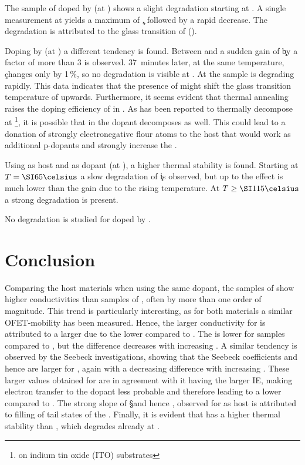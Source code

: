 The sample of \meo doped by \FS (at \C[0.040]) shows a slight degradation starting at \T[65]. A single measurement at \T[80] yields a maximum of \c, followed by a rapid decrease. The degradation is attributed to the glass transition of \meo (\Tg[67]\cite{Thelakkat1998}).

Doping \meo by \CSF (at \C[0.023]) a different tendency is found.
Between \T[70] and  a sudden gain of \c by a factor of more than 3 is observed. 37~minutes later, at the same temperature, \c changes only by 1\,\%, so no degradation is visible at \T[80]. At \T[90] the sample is degrading rapidly. 
This data indicates that the presence of \CSF might shift the glass transition temperature of \meo upwards. Furthermore, it seems evident that thermal annealing raises the doping efficiency of \CSF in \meo.
As \CSF has been reported\cite{Mao2013} to thermally decompose at \T[120]\footnote{on indium tin oxide (ITO) substrates}, it is possible that in \meo the dopant decomposes as well. This could lead to a donation of strongly electronegative flour atoms to the host that would work as additional p-dopants and strongly increase the \nhLong.

Using \lili as host and \FS as dopant (at \C[0.100]), a higher thermal stability is found. Starting at $\T[65]$ a slow degradation of \c is observed, but up to \T[100] the effect is much lower than the gain due to the rising temperature. At $\T{}\geq\grad{115}$ a strong degradation is present.

No degradation is studied for \lili doped by \CSF.

\pagebreak
\section{Conclusion} \label{sec:ResP-Conclusion}
Comparing the host materials when using the same dopant, the samples of \meo show higher conductivities than samples of \lili, often by more than one order of magnitude. This trend is particularly interesting, as for both materials a similar OFET-mobility has been measured. Hence, the larger conductivity for \meo is attributed to a larger \nhLong due to the lower \IE compared to \lili.
The \EactLong is lower for \meo samples compared to \lili, but the difference decreases with increasing \CLong. A similar tendency is observed by the Seebeck investigations, showing that the Seebeck coefficients and hence \Es are larger for \lili, again with a decreasing difference with increasing \CLong.
These larger values obtained for \lili are in agreement with it having the larger IE, making electron transfer to the dopant less probable and therefore leading to a lower \nhLong compared to \meo. The strong slope of \S and hence \Es, observed for \lili as host is attributed to filling of tail states of the \dosLong.
Finally, it is evident that \lili has a higher thermal stability than \meo, which degrades already at \T[80].

